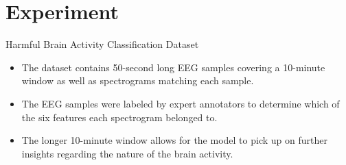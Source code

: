 \documentclass[leqno]{beamer}
\newcommand{\EE}{{\mathbb{E}}}
\newcommand{\PP}{{\mathbb{P}}}
\newcommand{\QQ}{{\mathbb{Q}}}
\newcommand{\Fb}{\mathbf{F}}
\newcommand{\Ib}{\mathbf{I}}
\newcommand{\hb}{\mathbf{h}}
\newcommand{\xb}{\mathbf{x}}
\newcommand{\one}{\mathbbm{1}}
\begin{document}


\section[Experiment]{Experiment}


\begin{frame}{Harmful Brain Activity Classification Dataset}
\begin{itemize}
\item The dataset contains 50-second long EEG samples covering a 10-minute
window as well as spectrograms matching each sample.
\bigskip
\item The EEG samples were labeled by expert annotators to determine which of
the six features each spectrogram belonged to.
\bigskip
\item The longer 10-minute window allows for the model to pick up on further
insights regarding the nature of the brain activity.
\end{itemize}
\end{frame}
\end{document}
